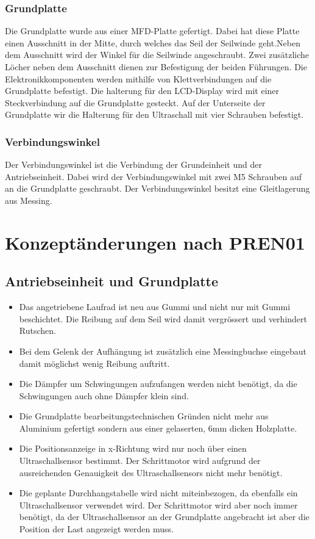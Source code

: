 \documentclass[a4paper]{report}
\begin{document}
\subsubsection{Grundplatte}
\label{sssec:GrundplatteBeschrieb}
Die Grundplatte wurde aus einer MFD-Platte gefertigt. Dabei hat diese Platte einen Ausschnitt in der Mitte, durch welches das Seil der Seilwinde geht.Neben dem Ausschnitt wird der Winkel für die Seilwinde angeschraubt. Zwei zusätzliche Löcher neben dem Ausschnitt dienen zur Befestigung der beiden Führungen. Die Elektronikkomponenten werden mithilfe von Klettverbindungen auf die Grundplatte befestigt. Die halterung für den LCD-Display wird mit einer Steckverbindung auf die Grundplatte gesteckt. Auf der Unterseite der Grundplatte wir die Halterung für den Ultraschall mit vier Schrauben befestigt.

\subsubsection{Verbindungswinkel}
\label{sssec:VerbindungswinkelBeschrieb}
Der Verbindungswinkel ist die Verbindung der Grundeinheit und der Antriebseinheit. Dabei wird der Verbindungswinkel mit zwei M5 Schrauben auf an die Grundplatte geschraubt. Der Verbindungswinkel besitzt eine Gleitlagerung aus Messing.


\section{Konzeptänderungen nach PREN01}
\label{sec:Konzeptaenderungen}

\subsection{Antriebseinheit und Grundplatte}

\begin{itemize}
		\item Das angetriebene Laufrad ist neu aus Gummi und nicht nur mit Gummi beschichtet. Die Reibung auf dem Seil wird damit vergrössert und verhindert Rutschen.
		\item Bei dem Gelenk der Aufhängung ist zusätzlich eine Messingbuchse eingebaut damit möglichst wenig Reibung auftritt.
		\item Die Dämpfer um Schwingungen aufzufangen werden nicht benötigt, da die Schwingungen auch ohne Dämpfer klein sind.
		\item Die Grundplatte bearbeitungstechnischen Gründen nicht mehr aus Aluminium gefertigt sondern aus einer gelaserten, 6mm dicken Holzplatte.
		\item Die Positionsanzeige in x-Richtung wird nur noch über einen Ultraschallsensor bestimmt. Der Schrittmotor wird aufgrund der ausreichenden Genauigkeit des Ultraschallsensors nicht mehr benötigt.
		\item Die geplante Durchhangstabelle wird nicht miteinbezogen, da ebenfalls ein Ultraschallsensor verwendet wird. Der Schrittmotor wird aber noch immer benötigt, da der Ultraschallsensor an der Grundplatte angebracht ist aber die Position der Last angezeigt werden muss.
\end{itemize}
\end{document}
